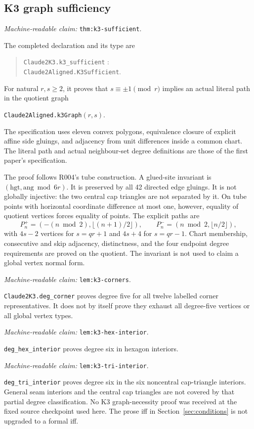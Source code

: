 \documentclass[11pt]{amsart}
\newcommand{\record}[1]{\nolinkurl{#1}}
\newcommand{\claimid}[1]{\par\nopagebreak\noindent\textit{Machine-readable claim:} \record{#1}.\par}
\theoremstyle{definition}\newtheorem{definition}{Definition}
\begin{document}
\subsection{K3 graph sufficiency}\label{thm:k3-sufficient}
\claimid{thm:k3-sufficient}
The completed declaration and its type are
\begin{quote}\small\noindent
\record{Claude2K3.k3_sufficient} :\\
\record{Claude2Aligned.K3Sufficient}.
\end{quote}
For natural $r,s\ge2$, it proves that $s\equiv\pm1\pmod r$ implies
an actual literal path in the quotient graph
\begin{center}\record{Claude2Aligned.k3Graph}$(r,s)$.\end{center}
The specification uses eleven
convex polygons, equivalence closure of explicit affine side gluings,
and adjacency from unit differences inside a common chart. The literal
path and actual neighbour-set degree definitions are those of the
first paper's specification.

The proof follows R004's tube construction. A glued-site invariant
is $(\mathrm{hgt},\mathrm{ang}\bmod6r)$. It is preserved by all
42 directed edge gluings. It is not globally injective: the two
central cap triangles are not separated by it. On tube points with
horizontal coordinate difference at most one, however, equality of
quotient vertices forces equality of points. The explicit paths are
\[
 P_n^+=(-(n\bmod2),\lfloor(n+1)/2\rfloor),\qquad
 P_n^-= (n\bmod2,\lfloor n/2\rfloor),
\]
with $4s-2$ vertices for $s=qr+1$ and $4s+4$ for $s=qr-1$.
Chart membership, consecutive and skip adjacency, distinctness, and
the four endpoint degree requirements are proved on the quotient.
The invariant is not used to claim a global vertex normal form.

\label{lem:k3-corners}\claimid{lem:k3-corners}
\record{Claude2K3.deg_corner} proves degree five for all twelve labelled
corner representatives. It does not by itself prove they exhaust all
degree-five vertices or all global vertex types.
\label{lem:k3-hex-interior}\claimid{lem:k3-hex-interior}
\record{deg_hex_interior} proves degree six in hexagon interiors.
\label{lem:k3-tri-interior}\claimid{lem:k3-tri-interior}
\record{deg_tri_interior} proves degree six in the six noncentral cap-triangle interiors.
General seam interiors and the central cap triangles are not covered
by that partial degree classification. No K3 graph-necessity proof
was received at the fixed source checkpoint used here. The prose iff
in Section~\ref{sec:conditions} is not upgraded to a formal iff.
\end{document}
